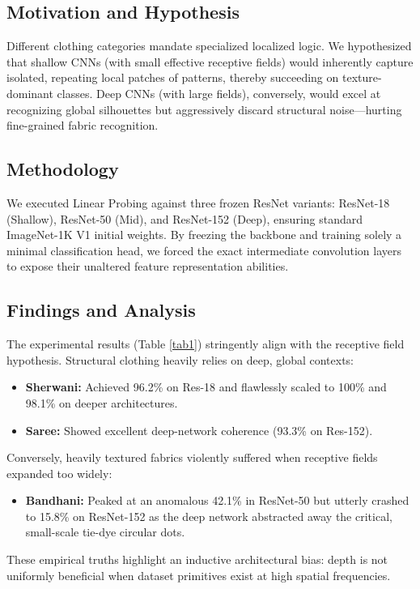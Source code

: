 \documentclass[12pt]{article}
\begin{document}
\subsection{Motivation and Hypothesis}
Different clothing categories mandate specialized localized logic. We hypothesized that shallow CNNs (with small effective receptive fields) would inherently capture isolated, repeating local patches of patterns, thereby succeeding on texture-dominant classes. Deep CNNs (with large fields), conversely, would excel at recognizing global silhouettes but aggressively discard structural noise—hurting fine-grained fabric recognition.

\subsection{Methodology}
We executed Linear Probing against three frozen ResNet variants: ResNet-18 (Shallow), ResNet-50 (Mid), and ResNet-152 (Deep), ensuring standard ImageNet-1K V1 initial weights. By freezing the backbone and training solely a minimal classification head, we forced the exact intermediate convolution layers to expose their unaltered feature representation abilities. 

\subsection{Findings and Analysis}
The experimental results (Table \ref{tab1}) stringently align with the receptive field hypothesis.
Structural clothing heavily relies on deep, global contexts:
\begin{itemize}[topsep=0pt, itemsep=2pt]
    \item \textbf{Sherwani:} Achieved 96.2\% on Res-18 and flawlessly scaled to 100\% and 98.1\% on deeper architectures.
    \item \textbf{Saree:} Showed excellent deep-network coherence (93.3\% on Res-152).
\end{itemize}

Conversely, heavily textured fabrics violently suffered when receptive fields expanded too widely:
\begin{itemize}[topsep=0pt, itemsep=2pt]
    \item \textbf{Bandhani:} Peaked at an anomalous 42.1\% in ResNet-50 but utterly crashed to 15.8\% on ResNet-152 as the deep network abstracted away the critical, small-scale tie-dye circular dots.
\end{itemize}
These empirical truths highlight an inductive architectural bias: depth is not uniformly beneficial when dataset primitives exist at high spatial frequencies. 
\end{document}
